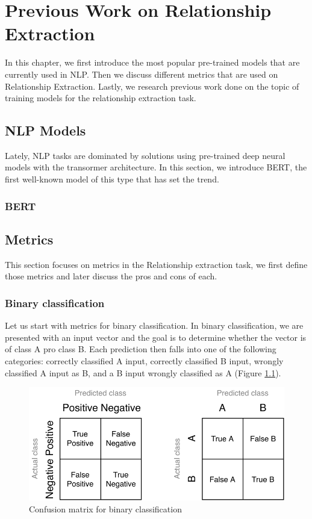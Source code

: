 \chapter{Previous Work on Relationship Extraction}
In this chapter, we first introduce the most popular pre-trained models that are currently used in NLP. Then we discuss different metrics that are used on Relationship Extraction. Lastly, we research previous work done on the topic of training models for the relationship extraction task.

\section{NLP Models}
Lately, NLP tasks are dominated by solutions using pre-trained deep neural models with the transormer architecture. In this section, we introduce BERT, the first well-known model of this type that has set the trend.
\subsection{BERT}


\section{Metrics}
This section focuses on metrics in the Relationship extraction task, we first define those metrics and later discuss the pros and cons of each.

\subsection{Binary classification}

Let us start with metrics for binary classification. In binary classification, we are presented with an input vector and the goal is to determine whether the vector is of class A pro class B. Each prediction then falls into one of the following categories: correctly classified A input, correctly classified B input, wrongly classified A input as B, and a B input wrongly classified as A (Figure \ref{obr:CM}). 

\begin{figure}[h]\centering
\includegraphics[width=140mm]{./img//Diplomka diagramy-Confusion matric}
\caption{Confusion matrix for binary classification}
\label{obr:CM}
\end{figure}

